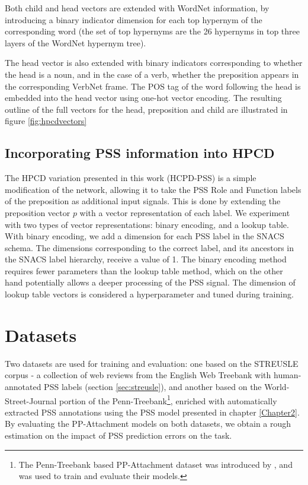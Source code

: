 Both child and head vectors are extended with WordNet information, by introducing a binary indicator dimension for each top hypernym of the corresponding word (the set of top hypernyms are the 26 hypernyms in top three layers of the WordNet hypernym tree). 

The head vector is also extended with binary indicators corresponding to whether the head is a noun, and in the case of a verb, whether the preposition appears in the corresponding VerbNet frame. The POS tag of the word following the head is embedded into the head vector using one-hot vector encoding. The resulting outline of the full vectors for the head, preposition and child are illustrated in figure \ref{fig:hpcdvectors}

\subsection{Incorporating PSS information into HPCD} \label{sec:hpcd_pss}

The HPCD variation presented in this work (HCPD-PSS) is a simple modification of the network, allowing it to take the PSS Role and Function labels of the preposition as additional input signals. This is done by extending the preposition vector $p$ with a vector representation of each label. We experiment with two types of vector representations: binary encoding, and a lookup table. With binary encoding, we add a dimension for each PSS label in the SNACS schema. The dimensions corresponding to the correct label, and its ancestors in the SNACS label hierarchy, receive a value of 1. The binary encoding method requires fewer parameters than the lookup table method, which on the other hand potentially allows a deeper processing of the PSS signal. The dimension of lookup table vectors is considered a hyperparameter and tuned during training.

\section{Datasets} \label{sec:ppatt_datasets}

Two datasets are used for training and evaluation: one based on the STREUSLE corpus - a collection of web reviews from the English Web Treebank with human-annotated PSS labels (section \ref{sec:streusle}), and another based on the World-Street-Journal portion of the Penn-Treebank\footnote{The Penn-Treebank based PP-Attachment dataset was introduced by \cite{hpcd}, and was used to train and evaluate their models.}, enriched with automatically extracted PSS annotations using the PSS model presented in chapter \ref{Chapter2}. By evaluating the PP-Attachment models on both datasets, we obtain a rough estimation on the impact of PSS prediction errors on the task.

